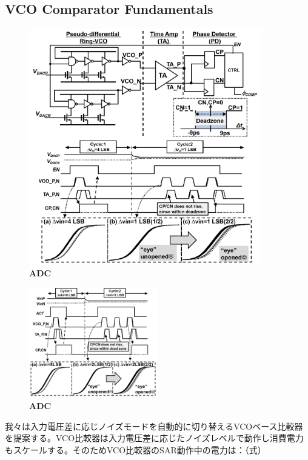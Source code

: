 \documentclass[letterpaper, 10 pt, conference]{ieeeconf}  %
\begin{document}
\subsection{VCO Comparator Fundamentals}
\begin{figure}[ht!]
\centering
 \includegraphics[width=0.9\textwidth]{figs/full.png}
  \captionsetup{font=footnotesize}
  \caption{\textbf{ADC}}
  \label{highlight}
\end{figure}

\begin{figure}[ht!]
\centering
 \includegraphics[width=0.5\textwidth]{figs/fig4.png}
  \captionsetup{font=footnotesize}
  \caption{\textbf{ADC}}
  \label{highlight}
\end{figure}
我々は入力電圧差に応じノイズモードを自動的に切り替えるVCOベース比較器を提案する\cite{yoshioka201413b}。VCO比較器は入力電圧差に応じたノイズレベルで動作し消費電力もスケールする。そのためVCO比較器のSAR動作中の電力は：（式）
\end{document}
